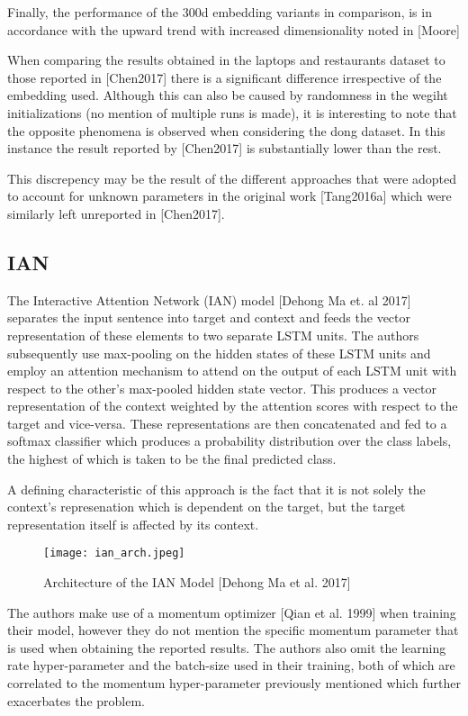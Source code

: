 \documentclass[../../fyp.tex]{subfiles}
\begin{document}
Finally, the performance of the 300d embedding variants in comparison, is in accordance with the upward trend with increased dimensionality noted in [Moore]

When comparing the results obtained in the laptops and restaurants dataset to those reported in [Chen2017] there is a significant difference irrespective of the embedding used. Although this can also be caused by randomness in the wegiht initializations (no mention of multiple runs is made), it is interesting to note that the opposite phenomena is observed when considering the dong dataset. In this instance the result reported by [Chen2017] is substantially lower than the rest.

This discrepency may be the result of the different approaches that were adopted to account for unknown parameters in the original work [Tang2016a] which were similarly left unreported in [Chen2017].

\subsection{IAN}

The Interactive Attention Network (IAN) model [Dehong Ma et. al 2017] separates the input sentence into target and context and feeds the vector representation of these elements to two separate LSTM units. The authors subsequently use max-pooling on the hidden states of these LSTM units and employ an attention mechanism to attend on the output of each LSTM unit with respect to the other's max-pooled hidden state vector. This produces a vector representation of the context weighted by the attention scores with respect to the target and vice-versa. These representations are then concatenated and fed to a softmax classifier which produces a probability distribution over the class labels, the highest of which is taken to be the final predicted class. 

A defining characteristic of this approach is the fact that it is not solely the context's represenation which is dependent on the target, but the target representation itself is affected by its context. 

\begin{figure}[!ht]
	\centering
	\texttt{[image: ian\_arch.jpeg]}
	\caption{Architecture of the IAN Model [Dehong Ma et al. 2017]}
	\label{fig:ffnn}
\end{figure}

The authors make use of a momentum optimizer [Qian et al. 1999] when training their model, however they do not mention the specific momentum parameter that is used when obtaining the reported results. The authors also omit the learning rate hyper-parameter and the batch-size used in their training, both of which are correlated to the momentum hyper-parameter previously mentioned which further exacerbates the problem. 
\end{document}
